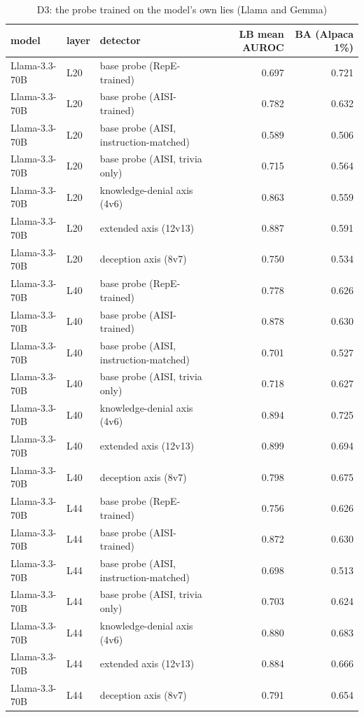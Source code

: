 \begin{table}
\caption{D3: the probe trained on the model's own lies (Llama and Gemma)}
\label{tab:x-aisi}
\begin{tabular}{lllrr}
\toprule
model & layer & detector & LB mean AUROC & BA (Alpaca 1\%) \\
\midrule
Llama-3.3-70B & L20 & base probe (RepE-trained) & 0.697 & 0.721 \\
Llama-3.3-70B & L20 & base probe (AISI-trained) & 0.782 & 0.632 \\
Llama-3.3-70B & L20 & base probe (AISI, instruction-matched) & 0.589 & 0.506 \\
Llama-3.3-70B & L20 & base probe (AISI, trivia only) & 0.715 & 0.564 \\
Llama-3.3-70B & L20 & knowledge-denial axis (4v6) & 0.863 & 0.559 \\
Llama-3.3-70B & L20 & extended axis (12v13) & 0.887 & 0.591 \\
Llama-3.3-70B & L20 & deception axis (8v7) & 0.750 & 0.534 \\
Llama-3.3-70B & L40 & base probe (RepE-trained) & 0.778 & 0.626 \\
Llama-3.3-70B & L40 & base probe (AISI-trained) & 0.878 & 0.630 \\
Llama-3.3-70B & L40 & base probe (AISI, instruction-matched) & 0.701 & 0.527 \\
Llama-3.3-70B & L40 & base probe (AISI, trivia only) & 0.718 & 0.627 \\
Llama-3.3-70B & L40 & knowledge-denial axis (4v6) & 0.894 & 0.725 \\
Llama-3.3-70B & L40 & extended axis (12v13) & 0.899 & 0.694 \\
Llama-3.3-70B & L40 & deception axis (8v7) & 0.798 & 0.675 \\
Llama-3.3-70B & L44 & base probe (RepE-trained) & 0.756 & 0.626 \\
Llama-3.3-70B & L44 & base probe (AISI-trained) & 0.872 & 0.630 \\
Llama-3.3-70B & L44 & base probe (AISI, instruction-matched) & 0.698 & 0.513 \\
Llama-3.3-70B & L44 & base probe (AISI, trivia only) & 0.703 & 0.624 \\
Llama-3.3-70B & L44 & knowledge-denial axis (4v6) & 0.880 & 0.683 \\
Llama-3.3-70B & L44 & extended axis (12v13) & 0.884 & 0.666 \\
Llama-3.3-70B & L44 & deception axis (8v7) & 0.791 & 0.654 \\

\end{tabular}
\end{table}
